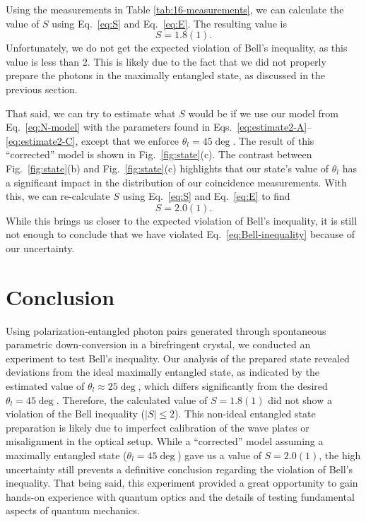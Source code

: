 \documentclass{../paper}
\newcommand{\eq}[1]{Eq.~\eqref{#1}}
\newcommand{\eqs}[2]{Eqs.~\eqref{#1}--\eqref{#2}}
\newcommand{\fig}[1]{Fig.~\ref{#1}}
\begin{document}
Using the measurements in Table \ref{tab:16-measurements}, we can calculate the value of $S$ using \eq{eq:S} and \eq{eq:E}. The resulting value is
\begin{equation}
  S = 1.8(1).
\end{equation}
Unfortunately, we do not get the expected violation of Bell's inequality, as this value is less than 2. This is likely due to the fact that we did not properly prepare the photons in the maximally entangled state, as discussed in the previous section.

That said, we can try to estimate what $S$ would be if we use our model from \eq{eq:N-model} with the parameters found in \eqs{eq:estimate2-A}{eq:estimate2-C}, except that we enforce $\theta_l = 45\deg$. The result of this ``corrected'' model is shown in \fig{fig:state}(c). The contrast between \fig{fig:state}(b) and \fig{fig:state}(c) highlights that our state's value of $\theta_l$ has a significant impact in the distribution of our coincidence measurements. With this, we can re-calculate $S$ using \eq{eq:S} and \eq{eq:E} to find
\begin{equation}
  S = 2.0(1).
\end{equation}
While this brings us closer to the expected violation of Bell's inequality, it is still not enough to conclude that we have violated \eq{eq:Bell-inequality} because of our uncertainty.

\section{Conclusion}\label{sec:conclusion}

Using polarization-entangled photon pairs generated through spontaneous parametric down-conversion in a birefringent crystal, we conducted an experiment to test Bell's inequality. Our analysis of the prepared state revealed deviations from the ideal maximally entangled state, as indicated by the estimated value of $\theta_l \approx 25\deg$, which differs significantly from the desired $\theta_l = 45\deg$. Therefore, the calculated value of $S = 1.8(1)$ did not show a violation of the Bell inequality ($|S| \leq 2$). This non-ideal entangled state preparation is likely due to imperfect calibration of the wave plates or misalignment in the optical setup. While a ``corrected'' model assuming a maximally entangled state ($\theta_l = 45\deg$) gave us a value of $S = 2.0(1)$, the high uncertainty still prevents a definitive conclusion regarding the violation of Bell's inequality. That being said, this experiment provided a great opportunity to gain hands-on experience with quantum optics and the details of testing fundamental aspects of quantum mechanics.
\end{document}
